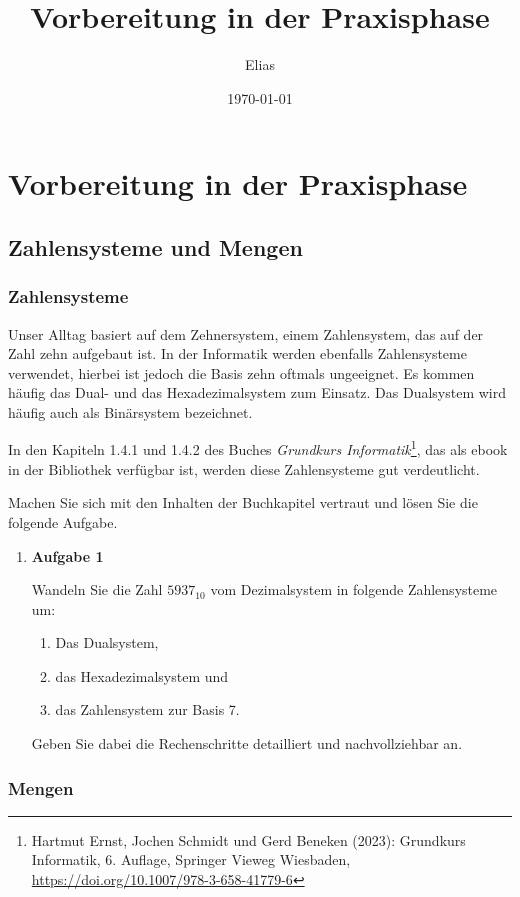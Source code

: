 \documentclass[a4paper,14pt,ngerman]{scrartcl}
\author{Elias}
\date{\today}
\title{Vorbereitung in der Praxisphase}
\begin{document}
\section{\textbf{Vorbereitung in der Praxisphase}}
\label{sec:orga193f8f}
\subsection{\textbf{Zahlensysteme und Mengen}}
\label{sec:orgfb5ab3a}
\subsubsection{\textbf{Zahlensysteme}}
\label{sec:orgddd662d}

Unser Alltag basiert auf dem Zehnersystem, einem Zahlensystem, das auf
der Zahl zehn aufgebaut ist. In der Informatik werden ebenfalls
Zahlensysteme verwendet, hierbei ist jedoch die Basis zehn oftmals
ungeeignet. Es kommen häufig das Dual- und das Hexadezimalsystem zum
Einsatz. Das Dualsystem wird häufig auch als Binärsystem bezeichnet.

In den Kapiteln 1.4.1 und 1.4.2 des Buches \emph{Grundkurs Informatik}\footnote{Hartmut Ernst, Jochen Schmidt und Gerd Beneken (2023): Grundkurs
Informatik, 6. Auflage, Springer Vieweg Wiesbaden,
\url{https://doi.org/10.1007/978-3-658-41779-6}},
das als ebook in der Bibliothek verfügbar ist, werden diese
Zahlensysteme gut verdeutlicht.

Machen Sie sich mit den Inhalten der Buchkapitel vertraut und lösen Sie
die folgende Aufgabe.
\begin{enumerate}
\item \textbf{Aufgabe 1}
\label{sec:orgaf70edc}

Wandeln Sie die Zahl \(5937_{10}\) vom Dezimalsystem in folgende
Zahlensysteme um:

\begin{enumerate}
\item Das Dualsystem,

\item das Hexadezimalsystem und

\item das Zahlensystem zur Basis 7.
\end{enumerate}

Geben Sie dabei die Rechenschritte detailliert und nachvollziehbar an.
\end{enumerate}
\subsubsection{\textbf{Mengen}}
\label{sec:org41dfe02}
\end{document}
